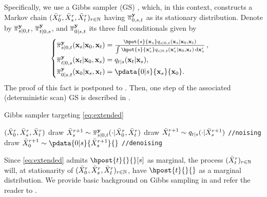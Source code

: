 Specifically, we use a Gibbs sampler (GS) \cite{geman1984stochastic, casella1992explaining,gelfand2000gibbs},  which, in this context, constructs a Markov chain $(\bar{X}^r _0, \bar{X}^r _s, \bar{X}^r _t)_{r\in\mathbb{N}}$ having $\epost{0, s, t}{}{}$ as its stationary distribution. Denote by $\epost{\smash{s|0, t}}{}{}$, $\epost{t|0, s}{}{}$, and $\epost{0|s, t}{}{}$ its three full conditionals given by 
 \begin{equation*}
    \label{eq:conditionals}
    \begin{cases}
        \begin{aligned}
            \epost{\smash{s|0, t}}{\bx_0, \bx_t}{\bx_s} & \txts = \frac{\hpot{s}{\bx_s} \fw{s|0, t}{\bx_0, \bx_t}{\bx _s}}{\int \hpot{s}{\bx^\prime _s} \fw{s|0, t}{\bx_0, \bx_t}{\bx^\prime _s} \, \rmd \bx^\prime _s} \eqsp,\\
            \epost{t|0, s}{\bx_0, \bx_s}{\bx_t} & = \fw{t|s}{\bx_s}{\bx_t}, \\
            \epost{0|s, t}{\bx_s, \bx_t}{\bx_0} & = \pdata{0|s}{\bx_s}{\bx_0}.
        \end{aligned}
    \end{cases}
\end{equation*}
The proof of this fact is postponed to .
Then, one step of the associated (deterministic scan) GS 
is described in
.

\begin{algorithm}[h]
    \caption{Gibbs sampler targeting \eqref{eq:extended}}
    \begin{algorithmic}[1]
         $(\bar{X}^r _0, \bar{X}^r _s, \bar{X}^r _t)$
        \STATE draw $\bXy^{r+1} _s \sim \epost{\smash{s|0, t}}{\bXy^r _0, \bXy^r _t}{}$ \label{step:bridge}
        \STATE draw $\bXy^{r+1} _t \sim \fw{t|s}{\bXy^{r+1} _s}{}$ \hfill {\small\texttt{//noising}}
        \STATE draw $\bXy^{r+1} _0 \sim \pdata{0|s}{\bXy^{r+1} _s}{}$ \label{step:denoising} \hfill {\small\texttt{//denoising}}  
    \end{algorithmic}
    \label{algo:extended-gibbs}
\end{algorithm}

Since \eqref{eq:extended} admits $\hpost{t}{}{}[s]$ as marginal, the process $(\bar{X}^r _t)_{r\in\mathbb{N}}$ will, at stationarity of $(\bar{X}^r _0, \bar{X}^r _s, \bar{X}^r _t)_{r\in\mathbb{N}}$, have $\hpost{t}{}{}$ as a marginal distribution. We provide basic background on Gibbs sampling in  and refer the reader to \cite{casella1992explaining}. 

